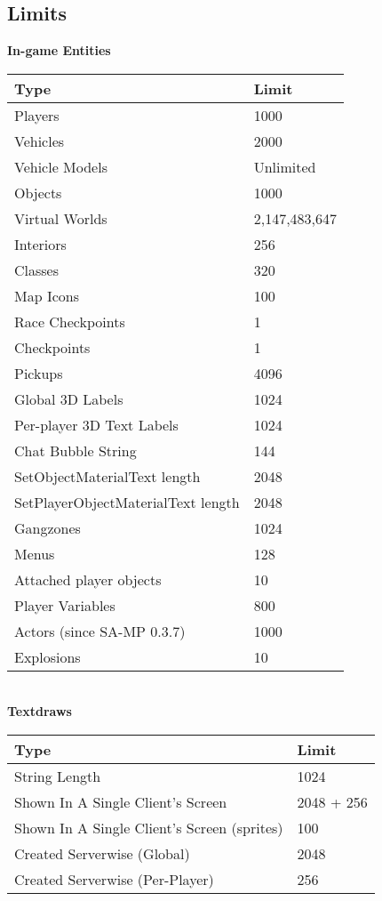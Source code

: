 \documentclass{article}
\begin{document}
\subsection{Limits}
\textbf{In-game Entities}
\bigskip
\\\begin{tabular}{ |l|l| } 
\hline
Type & Limit \\
\hline
Players & 1000 \\
Vehicles & 2000 \\
Vehicle Models & Unlimited \\
Objects & 1000 \\
Virtual Worlds & 2,147,483,647 \\
Interiors & 256 \\
Classes & 320 \\
Map Icons & 100 \\
Race Checkpoints & 1 \\
Checkpoints & 1 \\
Pickups & 4096 \\
Global 3D Labels & 1024 \\
Per-player 3D Text Labels & 1024 \\
Chat Bubble String & 144 \\
SetObjectMaterialText length & 2048 \\
SetPlayerObjectMaterialText length & 2048 \\
Gangzones & 1024 \\
Menus & 128 \\
Attached player objects & 10 \\
Player Variables & 800 \\
Actors (since SA-MP 0.3.7) & 1000 \\
Explosions & 10 \\
\hline
\end{tabular}
\bigskip
\\\textbf{Textdraws}
\bigskip
\\\begin{tabular}{ |l|l| } 
\hline
Type & Limit \\
\hline
String Length & 1024 \\
Shown In A Single Client's Screen & 2048 + 256 \\
Shown In A Single Client's Screen (sprites) & 100 \\
Created Serverwise (Global) & 2048 \\
Created Serverwise (Per-Player) & 256 \\
\hline
\end{tabular}
\end{document}
